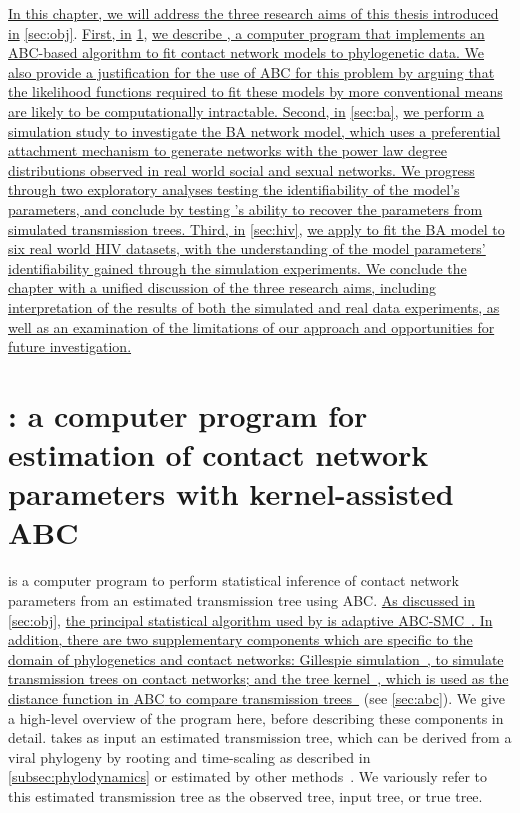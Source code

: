 

{\color{blue}\uline{ In this chapter, we will address the three research aims
of this thesis introduced in} \cref{sec:obj}. \uline{First, in}
\cref{sec:netabc}, \uline{we describe , a computer program
that implements an \acrlong{ABC}-based algorithm to fit contact network models
to phylogenetic data. We also provide a justification for the use of \gls{ABC}
for this problem by arguing that the likelihood functions required to fit these
models by more conventional means are likely to be computationally intractable.
Second, in} \cref{sec:ba}, \uline{we perform a simulation study to investigate
the \acrlong{BA} network model, which uses a preferential attachment mechanism
to generate networks with the power law degree distributions observed in real
world social and sexual networks. We progress through two exploratory analyses
testing the identifiability of the model's parameters, and conclude by testing
's ability to recover the parameters from simulated
transmission trees. Third, in} \cref{sec:hiv}, \uline{we apply
 to fit the \gls{BA} model to six real world \gls{HIV}
datasets, with the understanding of the model parameters' identifiability
gained through the simulation experiments. We conclude the chapter with a
unified discussion of the three research aims, including interpretation of the
results of both the simulated and real data experiments, as well as an
examination of the limitations of our approach and opportunities for future
investigation. }}

\section{: a computer program for estimation of contact
network parameters with kernel-assisted ABC}
\label{sec:netabc}

 is a computer program to perform statistical inference of
contact network parameters from an estimated transmission tree using
\gls{ABC}. {\color{blue}\uline{As discussed in }\cref{sec:obj}, \uline{the principal
statistical algorithm used by  is adaptive
\gls{ABC}-\gls{SMC}~\autocite{del2012adaptive}. In addition, there are two
supplementary components which are specific to the domain of phylogenetics and
contact networks: Gillespie simulation~\autocite{gillespie1976general}, to
simulate transmission trees on contact networks; and the tree
kernel~\autocite{poon2013mapping}, which is used as the distance function in
\gls{ABC} to compare transmission trees~\autocite{poon2015phylodynamic}} (see
\cref{sec:abc}).} We give a high-level overview of the program here, before
describing these components in detail.  takes as input an
estimated transmission tree, which can be derived from a viral phylogeny by
rooting and time-scaling as described in \cref{subsec:phylodynamics} or
estimated by other methods~\autocite{cottam2008integrating,
jombart2011reconstructing, ypma2012unravelling, morelli2012bayesian,
didelot2014bayesian, hall2015epidemic}. We variously refer to this estimated
transmission tree as the observed tree, input tree, or true tree.

